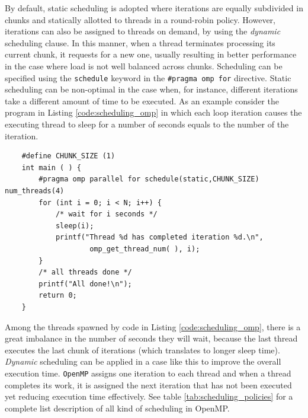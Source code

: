 \begin{description}
    By default, static scheduling is adopted where iterations are equally
    subdivided in chunks and statically allotted to threads in a
    round-robin policy. However, iterations can also be assigned to
    threads on demand, by using the \textit{dynamic} scheduling clause. In this
    manner, when a thread terminates processing its current chunk, it requests for a new one, usually resulting in better performance in the case where load is not well balanced across chunks.
    Scheduling can be specified using the \texttt{schedule} keyword in the \texttt{\#pragma omp for} directive.
    Static scheduling can be non-optimal in the case when, for instance, different iterations take a different amount of time to be executed. As an example consider the program in Listing \ref{code:scheduling_omp} in which each loop iteration causes the executing thread to sleep for a number of seconds equals to the number of the iteration. 
    \begin{lstlisting}
    #define CHUNK_SIZE (1)
    int main ( ) {
    	#pragma omp parallel for schedule(static,CHUNK_SIZE) num_threads(4)
    	for (int i = 0; i < N; i++) {
    		/* wait for i seconds */
    		sleep(i);    		
    		printf("Thread %d has completed iteration %d.\n", 
    				omp_get_thread_num( ), i);
    	}
    	/* all threads done */
    	printf("All done!\n");
    	return 0;
    }
\end{lstlisting}
Among the threads spawned by code in Listing \ref{code:scheduling_omp}, there is a great imbalance  in the number of seconds they will wait,  because the last thread executes the last chunk of iterations (which translates to longer sleep time).
\textit{Dynamic} scheduling can be applied in a case like this to improve the overall execution time. \texttt{OpenMP} assigns one iteration to each thread and when a thread completes its work, it is assigned the next iteration that has not been executed yet reducing execution time effectively. See table \ref{tab:scheduling_policies} for a complete list description of all kind of scheduling in OpenMP.


\end{description}
